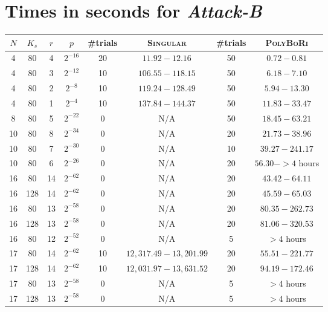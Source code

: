 \documentclass{llncs}
\begin{document}
\clearpage

\section{Times in seconds for \emph{Attack-B}}
\label{app:present-att-b}
\begin{table}[htbp]
\begin{center}
\begin{tabular}{|c|c|c|c|c|c|c|c|}
\hline
$N$ & $K_s$ & $r$ & $p$ & \#trials & \textsc{Singular}& \#trials &
\textsc{PolyBoRi}\\
\hline
 4 &  80 &  4 & $2^{-16}$ & 20 & $11.92-12.16$   & 50 & $0.72 - 0.81$ \\
 4 &  80 &  3 & $2^{-12}$ & 10 & $106.55-118.15$ & 50 & $6.18 - 7.10$ \\
 4 &  80 &  2 &  $2^{-8}$ & 10 & $119.24-128.49$ & 50 & $5.94 - 13.30$ \\
 4 &  80 &  1 &  $2^{-4}$ & 10 & $137.84-144.37$ & 50 & $11.83- 33.47$
\\
\hline
 8 &  80 &  5 & $2^{-22}$ & 0 &  N/A               & 50 & $18.45 - 63.21$\\
\hline
10 &  80 &  8 & $2^{-34}$ & 0 &  N/A               & 20 & $21.73-38.96$ \\
10 &  80 &  7 & $2^{-30}$ & 0 &  N/A               & 10 & $39.27 - 241.17$\\
10 &  80 &  6 & $2^{-26}$ & 0 &  N/A               & 20 & $56.30 - >4$ hours\\
\hline
16 &  80 & 14 & $2^{-62}$ & 0 & N/A                & 20 & $43.42-64.11$ \\
16 & 128 & 14 & $2^{-62}$ & 0 & N/A                & 20 & $45.59-65.03$ \\
16 &  80 & 13 & $2^{-58}$ & 0 & N/A                & 20 & $80.35-262.73$\\
16 & 128 & 13 & $2^{-58}$ & 0 & N/A                & 20 & $81.06-320.53$ \\
16 &  80 & 12 & $2^{-52}$ & 0 & N/A                & 5 & $>4$ hours\\
\hline
17 &  80 & 14 & $2^{-62}$ & 10 & $12,317.49-13,201.99$ & 20 & $55.51 - 221.77$\\
17 & 128 & 14 & $2^{-62}$ & 10 & $12,031.97-13,631.52$ & 20 & $94.19 - 172.46$\\
17 &  80 & 13 & $2^{-58}$ & 0 & N/A                & 5 & $>4$ hours\\
17 & 128 & 13 & $2^{-58}$ & 0 & N/A                & 5 & $>4$ hours\\
\hline
\end{tabular}
\end{center}
\end{table}
\end{document}
